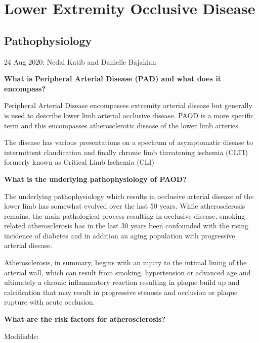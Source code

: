 \documentclass[
]{book}
\begin{document}
\hypertarget{lower-extremity-occlusive-disease}{%
\chapter{Lower Extremity Occlusive Disease}\label{lower-extremity-occlusive-disease}}

\hypertarget{pathophysiology}{%
\section{Pathophysiology}\label{pathophysiology}}

24 Aug 2020: Nedal Katib and Danielle Bajakian

\textbf{What is Peripheral Arterial Disease (PAD) and what does it
encompass?}

Peripheral Arterial Disease encompasses extremity arterial disease but
generally is used to describe lower limb arterial occlusive disease.
PAOD is a more specific term and this encompasses atherosclerotic
disease of the lower limb arteries.

The disease has various presentations on a spectrum of asymptomatic
disease to intermittent claudication and finally chronic limb
threatening ischemia (CLTI) formerly known as Critical Limb Ischemia
(CLI) \citep{aboyans2017ESCGuidelines2018}

\textbf{What is the underlying pathophysiology of PAOD?}

The underlying pathophysiology which results in occlusive arterial
disease of the lower limb has somewhat evolved over the last 50 years.
While atherosclerosis remains, the main pathological process resulting
in occlusive disease, smoking related atherosclerosis has in the last 30
years been confounded with the rising incidence of diabetes and in
addition an aging population with progressive arterial disease.

Atherosclerosis, in summary, begins with an injury to the intimal lining
of the arterial wall, which can result from smoking, hypertension or
advanced age and ultimately a chronic inflammatory reaction resulting in
plaque build up and calcification that may result in progressive
stenosis and occlusion or plaque rupture with acute occlusion.

\textbf{What are the risk factors for atherosclerosis?}

Modifiable:
\end{document}

